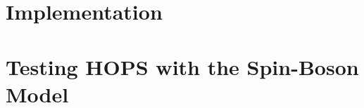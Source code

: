\section{Implementation}
\label{sec:implementing_HOPS}

\newpage
\section{Testing HOPS with the Spin-Boson Model}
